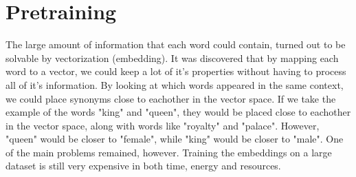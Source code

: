 \documentclass{report}
\begin{document}

\section{Pretraining}
\noindent
The large amount of information that each word could contain, turned out to be solvable by vectorization (embedding). It was discovered that by mapping each word to a vector, we could keep a lot of it's properties without having to process all of it's information. By looking at which words appeared in the same context, we could place synonyms close to eachother in the vector space. If we take the example of the words "king" and "queen", they would be placed close to eachother in the vector space, along with words like "royalty" and "palace". However, "queen" would be closer to "female", while "king" would be closer to "male". One of the main problems remained, however. Training the embeddings on a large dataset is still very expensive in both time, energy and resources.
\noindent
\end{document}
